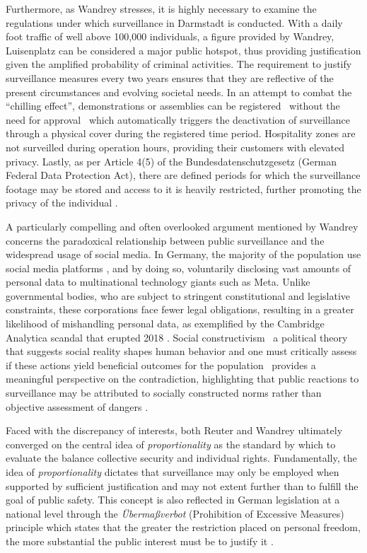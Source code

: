 \documentclass[12pt]{article}
\begin{document}
	Furthermore, as Wandrey stresses, it is highly necessary to examine the regulations under which surveillance in Darmstadt is conducted. With a daily foot traffic of well above 100,000 individuals, a figure provided by Wandrey, Luisenplatz can be considered a major public hotspot, thus providing justification given the amplified probability of criminal activities. The requirement to justify surveillance measures every two years ensures that they are reflective of the present circumstances and evolving societal needs. In an attempt to combat the ``chilling effect'', demonstrations or assemblies can be registered \textemdash\ without the need for approval \textemdash\ which automatically triggers the deactivation of surveillance through a physical cover during the registered time period. Hospitality zones are not surveilled during operation hours, providing their customers with elevated privacy. Lastly, as per Article 4(5) of the Bundesdatenschutzgesetz (German Federal Data Protection Act), there are defined periods for which the surveillance footage may be stored and access to it is heavily restricted, further promoting the privacy of the individual \parencite{gesetzeimInternet_BDSG4}. 
	
	A particularly compelling and often overlooked argument mentioned by Wandrey concerns the paradoxical relationship between public surveillance and the widespread usage of social media. In Germany, the majority of the population use social media platforms \parencite{koptyug2025, worldometer_germany2025}, and by doing so, voluntarily disclosing vast amounts of personal data to multinational technology giants such as Meta. Unlike governmental bodies, who are subject to stringent constitutional and legislative constraints, these corporations face fewer legal obligations, resulting in a greater likelihood of mishandling personal data, as exemplified by the Cambridge Analytica scandal that erupted 2018 \parencite{harbath_cambridge_2023}. Social constructivism \textemdash\ a political theory that suggests social reality shapes human behavior and one must critically assess if these actions yield beneficial outcomes for the population \textemdash\ provides a meaningful perspective on the contradiction, highlighting that public reactions to surveillance may be attributed to socially constructed norms rather than objective assessment of dangers \parencite{courseCompanion2024}. 
	
	Faced with the discrepancy of interests, both Reuter and Wandrey ultimately converged on the central idea of \textit{proportionality} as the standard by which to evaluate the balance collective security and individual rights. Fundamentally, the idea of \textit{proportionality} dictates that surveillance may only be employed when supported by sufficient justification and may not extent further than to fulfill the goal of public safety. This concept is also reflected in German legislation at a national level through the \textit{Übermaßverbot} (Prohibition of Excessive Measures) principle which states that the greater the restriction placed on personal freedom, the more substantial the public interest must be to justify it \parencite{wetzling2023}.
	
\end{document}
